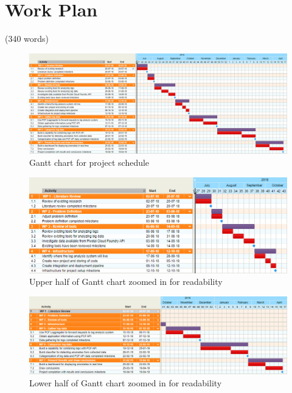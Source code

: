 \chapter{Work Plan}

(340 words)

\begin{figure}[ht]
  \centering
  \includegraphics[width=1.0\textwidth]{./figures/gantt.png}
  \caption{Gantt chart for project schedule}
  \label{fig:gantt}
\end{figure}

\begin{figure}[ht]
  \centering
  \includegraphics[width=1.0\textwidth]{./figures/gantt-small-top.png}
  \caption{Upper half of Gantt chart zoomed in for readability}
  \label{fig:gantt}
\end{figure}

\clearpage

\begin{figure}[ht]
  \centering
  \includegraphics[width=1.0\textwidth]{./figures/gantt-small-bottom.png}
  \caption{Lower half of Gantt chart zoomed in for readability}
  \label{fig:gantt}
\end{figure}

